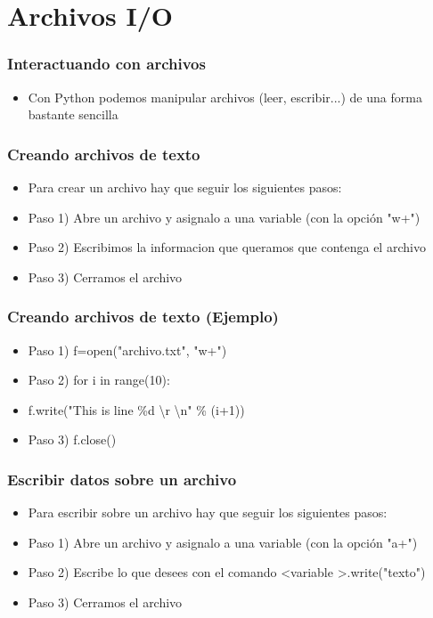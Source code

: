 \documentclass[hyperref={pdfpagelabels=false},xcolor=pst,pdf,fragile]{beamer}
\begin{document}
\section{Archivos I/O}
\begin{frame}
    \frametitle{Interactuando con archivos}
    \pause
    \begin{itemize}
    \item Con Python podemos manipular archivos (leer, escribir...) de una forma bastante sencilla
    \end{itemize}
\end{frame}

\begin{frame}
    \frametitle{Creando archivos de texto}
    \pause
    \begin{itemize}
    \item Para crear un archivo hay que seguir los siguientes pasos:
    \item Paso 1) Abre un archivo y asignalo a una variable (con la opción "w+")
    \item Paso 2) Escribimos la informacion que queramos que contenga el archivo
    \item Paso 3) Cerramos el archivo
    \end{itemize}
\end{frame}

\begin{frame}
    \frametitle{Creando archivos de texto (Ejemplo)}
    \pause
    \begin{itemize}
    \item Paso 1) f=open("archivo.txt", "w+")
    \item Paso 2) for i in range(10):
    \item \quad \quad \quad f.write("This is line \%d \textbackslash r \textbackslash n" \% (i+1))
    \item Paso 3) f.close()
    \end{itemize}
\end{frame}

\begin{frame}
    \frametitle{Escribir datos sobre un archivo}
    \pause
    \begin{itemize}
    \item Para escribir sobre un archivo hay que seguir los siguientes pasos:
    \item Paso 1) Abre un archivo y asignalo a una variable (con la opción "a+")
    \item Paso 2) Escribe lo que desees con el comando \textless variable \textgreater.write("texto")
    \item Paso 3) Cerramos el archivo
    \end{itemize}
\end{frame}
\end{document}
